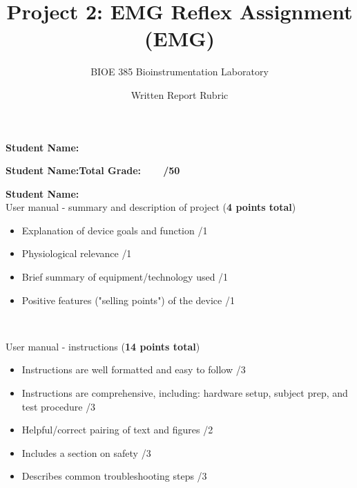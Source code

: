 \documentclass{article}
\title{Project 2: EMG Reflex Assignment (EMG)}
\author{BIOE 385 Bioinstrumentation Laboratory}
\date{Written Report Rubric}
\begin{document}
\large
\maketitle

\textbf{Student Name:}\vspace{0.5cm}

\textbf{Student Name:}\hfill 	\textbf{Total Grade:\ \ \ \ \underline{\hspace{1cm}}/50}\vspace{0.5cm}

\textbf{Student Name:}\hfill\\

User manual - summary and description of project (\textbf{4 points total})
\begin{small}
\begin{itemize}
	\item Explanation of device goals and function \hfill \underline{\hspace{1cm}}/1
	\item Physiological relevance \hfill \underline{\hspace{1cm}}/1
	\item Brief summary of equipment/technology used \hfill \underline{\hspace{1cm}}/1
	\item Positive features ("selling points") of the device \hfill \underline{\hspace{1cm}}/1
\end{itemize}
\end{small}\

User manual - instructions (\textbf{14 points total})
\begin{small}
\begin{itemize}
	\item Instructions are well formatted and easy to follow \hfill \underline{\hspace{1cm}}/3
	\item Instructions are comprehensive, including: hardware setup, subject prep, and test procedure \hfill \underline{\hspace{1cm}}/3
	\item Helpful/correct pairing of text and figures \hfill \underline{\hspace{1cm}}/2
	\item Includes a section on safety \hfill \underline{\hspace{1cm}}/3
	\item Describes common troubleshooting steps \hfill \underline{\hspace{1cm}}/3
\end{itemize}
\end{small}\
\end{document}
